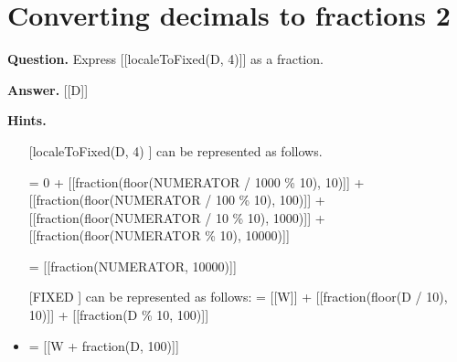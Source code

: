 \documentclass{article}
\begin{document}
\section*{Converting decimals to fractions 2}
\textbf{Question.} Express [[localeToFixed(D, 4)]] as a fraction.

\textbf{Answer.} [[D]]

\textbf{Hints.}
\begin{itemize}
  \item [[localeToFixed(D, 4)]] can be represented as follows.
                    
                        = 0 + 
                        [[fraction(floor(NUMERATOR / 1000 \% 10), 10)]] + 
                        [[fraction(floor(NUMERATOR / 100 \% 10), 100)]] + 
                        [[fraction(floor(NUMERATOR / 10 \% 10), 1000)]] + 
                        [[fraction(floor(NUMERATOR \% 10), 10000)]]
                    
                    = [[fraction(NUMERATOR, 10000)]]
  \item [[FIXED]] can be represented as follows:
                    = [[W]] + [[fraction(floor(D / 10), 10)]] + [[fraction(D \% 10, 100)]]
  \item = [[W  + fraction(D, 100)]]
\end{itemize}
\end{document}
